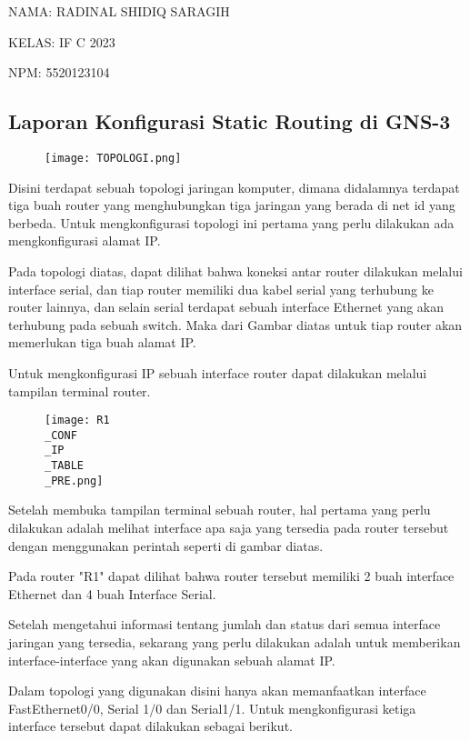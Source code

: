 \documentclass[12pt, a4paper]{article}
\date{}
\begin{document}
    NAMA: RADINAL SHIDIQ SARAGIH

    KELAS: IF C 2023

    NPM: 5520123104

  \begin{center}
    \section*{Laporan Konfigurasi Static Routing di GNS-3}
  \end{center}

  \begin{figure}[h]
      \centering
      \texttt{[image: TOPOLOGI.png]}
  \end{figure}

  Disini terdapat sebuah topologi jaringan komputer, dimana didalamnya
  terdapat tiga buah router yang menghubungkan tiga jaringan yang berada
  di net id yang berbeda. Untuk mengkonfigurasi topologi ini pertama yang
  perlu dilakukan ada mengkonfigurasi alamat IP.

  Pada topologi diatas, dapat dilihat bahwa koneksi antar router
  dilakukan melalui interface serial, dan tiap router memiliki dua kabel
  serial yang terhubung ke router lainnya, dan selain serial terdapat
  sebuah interface Ethernet yang akan terhubung
  pada sebuah switch. Maka dari Gambar diatas untuk tiap router akan
  memerlukan tiga buah alamat IP.

  Untuk mengkonfigurasi IP sebuah interface router dapat dilakukan melalui
  tampilan terminal router.
  
  \begin{figure}[h]
      \centering
      \texttt{[image: R1\\\_CONF\\\_IP\\\_TABLE\\\_PRE.png]}
  \end{figure}

  Setelah membuka tampilan terminal sebuah router, hal pertama yang
  perlu dilakukan adalah melihat interface apa saja yang tersedia pada router
  tersebut dengan menggunakan perintah seperti di gambar diatas.

  Pada router "R1" dapat dilihat bahwa router tersebut memiliki 2 buah 
  interface Ethernet dan 4 buah Interface Serial.

  Setelah mengetahui informasi tentang jumlah dan status dari semua
  interface jaringan yang tersedia, sekarang yang perlu dilakukan adalah
  untuk memberikan interface-interface yang akan digunakan sebuah alamat
  IP.

  Dalam topologi yang digunakan disini hanya akan memanfaatkan interface 
  FastEthernet0/0, Serial 1/0 dan Serial1/1. Untuk mengkonfigurasi ketiga
  interface tersebut dapat dilakukan sebagai berikut.
\end{document}
